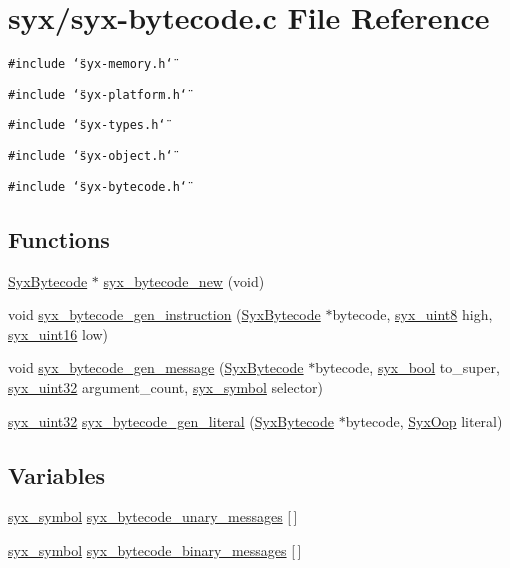 \hypertarget{syx-bytecode_8c}{
\section{syx/syx-bytecode.c File Reference}
\label{syx-bytecode_8c}
}
{\tt \#include \char`\"{}syx-memory.h\char`\"{}}\par
{\tt \#include \char`\"{}syx-platform.h\char`\"{}}\par
{\tt \#include \char`\"{}syx-types.h\char`\"{}}\par
{\tt \#include \char`\"{}syx-object.h\char`\"{}}\par
{\tt \#include \char`\"{}syx-bytecode.h\char`\"{}}\par
\subsection*{Functions}
\begin{CompactItemize}
\item 
\hyperlink{struct_syx_bytecode}{SyxBytecode} $\ast$ \hyperlink{syx-bytecode_8c_66169f5d9d84f663e2f04aba3502f179}{syx\_\-bytecode\_\-new} (void)
\item 
void \hyperlink{syx-bytecode_8c_ffb00acd600dc431d1cfe10edae1ee69}{syx\_\-bytecode\_\-gen\_\-instruction} (\hyperlink{struct_syx_bytecode}{SyxBytecode} $\ast$bytecode, \hyperlink{syx-types_8h_7cb1870b8124a88e807c98f315f3d923}{syx\_\-uint8} high, \hyperlink{syx-types_8h_5c0caeeeb45b4575061ab7f368f10337}{syx\_\-uint16} low)
\item 
void \hyperlink{syx-bytecode_8c_6e08f49fece1127fa50ab8be456774d2}{syx\_\-bytecode\_\-gen\_\-message} (\hyperlink{struct_syx_bytecode}{SyxBytecode} $\ast$bytecode, \hyperlink{syx-types_8h_c6dc09b276b99fa1956364359139daab}{syx\_\-bool} to\_\-super, \hyperlink{syx-types_8h_eb2d8221bf07737360750e4c0ec66a99}{syx\_\-uint32} argument\_\-count, \hyperlink{syx-types_8h_9663af54b7b72f5d8be5f754ef356525}{syx\_\-symbol} selector)
\item 
\hyperlink{syx-types_8h_eb2d8221bf07737360750e4c0ec66a99}{syx\_\-uint32} \hyperlink{syx-bytecode_8c_ba09d19921e45c7b3a186762c622ead5}{syx\_\-bytecode\_\-gen\_\-literal} (\hyperlink{struct_syx_bytecode}{SyxBytecode} $\ast$bytecode, \hyperlink{syx-types_8h_1121caba2d40b2ce090b640762744ccd}{SyxOop} literal)
\end{CompactItemize}
\subsection*{Variables}
\begin{CompactItemize}
\item 
\hyperlink{syx-types_8h_9663af54b7b72f5d8be5f754ef356525}{syx\_\-symbol} \hyperlink{syx-bytecode_8c_2d5efd1c4984dc8e4a86ac7062a41716}{syx\_\-bytecode\_\-unary\_\-messages} \mbox{[}$\,$\mbox{]}
\item 
\hyperlink{syx-types_8h_9663af54b7b72f5d8be5f754ef356525}{syx\_\-symbol} \hyperlink{syx-bytecode_8c_90d7e46b6b031c996ce7cc81083a6fa7}{syx\_\-bytecode\_\-binary\_\-messages} \mbox{[}$\,$\mbox{]}
\end{CompactItemize}


